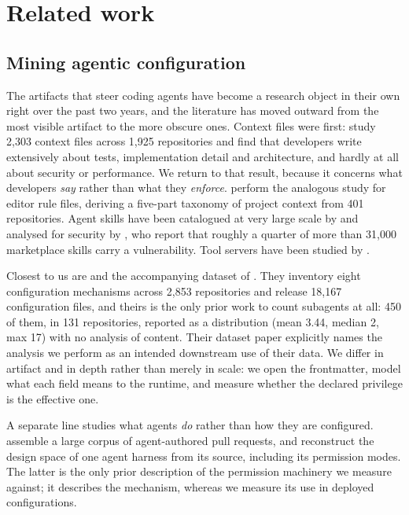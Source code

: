 \documentclass[smallextended,natbib]{svjour3}
\begin{document}
\section{Related work}
\label{sec:related}

\subsection{Mining agentic configuration}

The artifacts that steer coding agents have become a research object in their own right over the past
two years, and the literature has moved outward from the most visible artifact to the more obscure
ones. Context files were first: \citet{chatlatanagulchai2025readmes} study 2{,}303 context files
across 1{,}925 repositories and find that developers write extensively about tests, implementation
detail and architecture, and hardly at all about security or performance. We return to that result,
because it concerns what developers \emph{say} rather than what they \emph{enforce}.
\citet{jiang2026cursorrules} perform the analogous study for editor rule files, deriving a five-part
taxonomy of project context from 401 repositories. Agent skills have been catalogued at very large
scale by \citet{destefanis2026gitskills} and analysed for security by \citet{liu2026agentskills}, who
report that roughly a quarter of more than 31{,}000 marketplace skills carry a vulnerability. Tool
servers have been studied by \citet{hasan2025mcp}.

Closest to us are \citet{galster2026configuring} and the accompanying dataset of
\citet{galster2026dataset}. They inventory eight configuration mechanisms across 2{,}853
repositories and release 18{,}167 configuration files, and theirs is the only prior work to count
subagents at all: 450 of them, in 131 repositories, reported as a distribution (mean 3.44, median 2,
max 17) with no analysis of content. Their dataset paper explicitly names the analysis we perform as
an intended downstream use of their data. We differ in artifact and in depth rather than merely in
scale: we open the frontmatter, model what each field means to the runtime, and measure whether the
declared privilege is the effective one.

A separate line studies what agents \emph{do} rather than how they are configured.
\citet{li2026aidev} assemble a large corpus of agent-authored pull requests, and
\citet{liu2026diveinto} reconstruct the design space of one agent harness from its source, including
its permission modes. The latter is the only prior description of the permission machinery we
measure against; it describes the mechanism, whereas we measure its use in deployed configurations.
\end{document}
